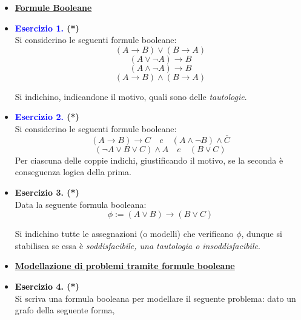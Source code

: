 \documentclass[a4paper,10pt]{article}
\begin{document}
    {\normalsize
    \begin{itemize}[label=, leftmargin=0pt]

    \item \textbf{\underline{Formule Booleane}}
    \item \textbf{\textcolor{blue}{Esercizio 1.} (*)}\\ 	
    Si considerino le seguenti formule booleane:
    $$(A\rightarrow B)\lor(B\rightarrow A)$$
    $$(A \lor \lnot A)\rightarrow B$$
    $$(A \land \lnot A)\rightarrow B$$
    $$(A\rightarrow B)\land (B\rightarrow A)$$
    
    Si indichino, indicandone il motivo, quali sono delle \textit{tautologie}.
    

    \item \textbf{\textcolor{blue}{Esercizio 2. }(*)}\\ 	
    Si considerino le seguenti formule booleane:
    $$(A\rightarrow B)\rightarrow C \quad e\quad (A\land \lnot B)\land\overline C$$
    $$(\lnot A \lor B\lor C)\land A \quad e \quad (B\lor C)$$
    Per ciascuna delle coppie indichi, giustificando il motivo, se la seconda è conseguenza logica della prima.
    
    \item \textbf{Esercizio 3. (*)}\\ 	
    Data la seguente formula booleana:
    $$\phi:= (A\lor B) \rightarrow (B\lor C)$$
    
    Si indichino tutte le assegnazioni (o modelli) che verificano $\phi$, dunque si stabilisca se essa è \textit{soddisfacibile, una tautologia o insoddisfacibile}.\\[0.2cm]
    

    \item \textbf{\underline{Modellazione di problemi tramite formule booleane}}
    \item \textbf{\textcolor{black}{Esercizio 4.} (*)}\\ 	
    Si scriva una formula booleana per modellare il seguente problema: dato un grafo della seguente forma,

    \begin{center}
\end{center}
\end{itemize}}
\end{document}

